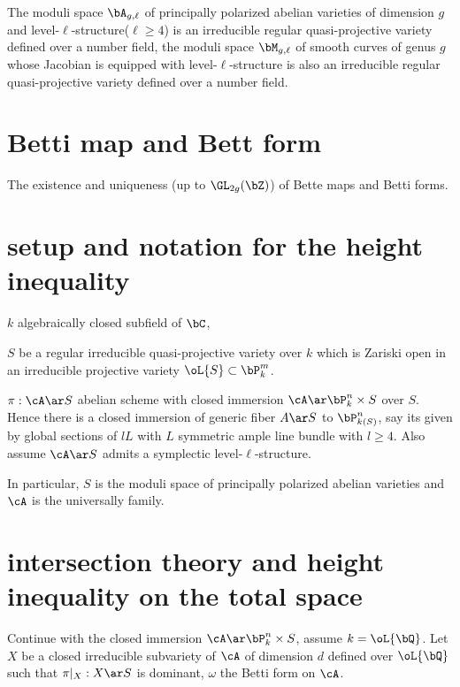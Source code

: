 \begin{fct}
  The moduli space $\bA_{g,\ell}$ of principally polarized abelian varieties of dimension $g$ and level-$\ell$-structure($\ell\geq 4$) is an irreducible regular quasi-projective variety defined over a number field, the moduli space $\bM_{g,\ell}$ of smooth curves of genus $g$ whose Jacobian is equipped with level-$\ell$-structure is also an irreducible regular quasi-projective variety defined over a number field.
\end{fct}


\section{Betti map and Bett form}

The existence and uniqueness (up to $\GL_{2g}(\bZ)$) of Bette maps and Betti forms.




\section{setup and notation for the height inequality}
\begin{stp}
  $k$ algebraically closed subfield of $\bC$,

  $S$ be a regular irreducible quasi-projective variety over $k$ which is Zariski open in an irreducible projective variety $\oL{S}\subset\bP_{k}^{m}$.

  $\pi:\cA\ar S$ abelian scheme with closed immersion $\cA\ar\bP_{k}^{n}\times S$ over $S$. Hence there is a closed immersion of generic fiber $A\ar S$ to $\bP_{k(S)}^{n}$, say its given by global sections of $lL$ with $L$ symmetric ample line bundle with $l\geq 4$. Also assume $\cA\ar S$ admits a symplectic level-$\ell$-structure.

  In particular, $S$ is the moduli space of principally polarized abelian varieties and $\cA$ is the universally family.
\end{stp}




\section{intersection theory and height inequality on the total space}

\begin{stp}
  Continue with the closed immersion $\cA\ar\bP_{k}^{n}\times S$, assume $k=\oL{\bQ}$. Let $X$ be a closed irreducible subvariety of $\cA$ of dimension $d$ defined over $\oL{\bQ}$ such that $\pi|_{X}:X\ar S$ is dominant, $\omega$ the Betti form on $\cA$.
\end{stp}

